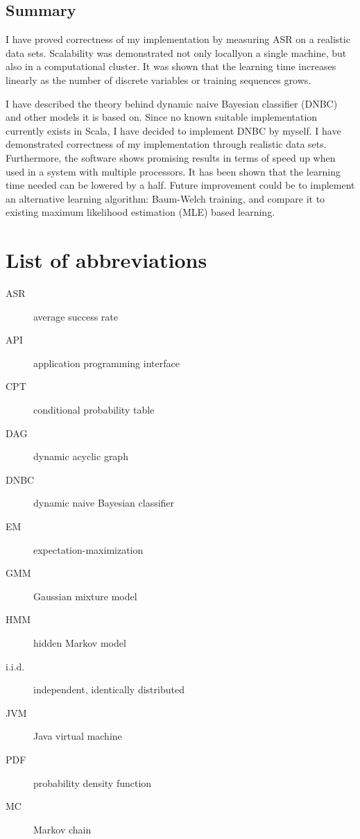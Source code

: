 \documentclass[thesis=B,english]{FITthesis}[2012/06/26]
\begin{document}
\section{Summary}
I have proved correctness of my implementation by measuring ASR on a realistic data sets. Scalability was demonstrated not only locally\textemdash on a single machine, but also in a computational cluster. It was shown that the learning time increases linearly as the number of discrete variables or training sequences grows.

\begin{conclusion}
I have described the theory behind dynamic naive Bayesian classifier (DNBC) and other models it is based on. Since no known suitable implementation currently exists in Scala, I have decided to implement DNBC by myself. I have demonstrated correctness of my implementation through realistic data sets. Furthermore, the software shows promising results in terms of speed up when used in a system with multiple processors. It has been shown that the learning time needed can be lowered by a half. Future improvement could be to implement an alternative learning algorithm: Baum-Welch training, and compare it to existing maximum likelihood estimation (MLE) based learning.
\end{conclusion}




\appendix

\chapter{List of abbreviations}
\begin{description}
	\item[ASR] average success rate
	\item[API] application programming interface
	\item[CPT] conditional probability table
	\item[DAG] dynamic acyclic graph
	\item[DNBC] dynamic naive Bayesian classifier
	\item[EM] expectation-maximization
	\item[GMM] Gaussian mixture model
	\item[HMM] hidden Markov model
	\item[i.i.d.] independent, identically distributed
	\item[JVM] Java virtual machine
	\item[PDF] probability density function
	\item[MC] Markov chain
\end{description}
\end{document}
